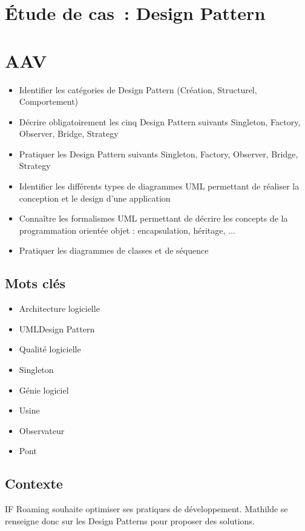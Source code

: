 \newpage
\section*{Étude de cas~: Design Pattern}

\section*{AAV}
\begin{itemize}
	\item [1] Identifier les catégories de Design Pattern (Création, Structurel, Comportement)
	\item [1] Décrire obligatoirement les cinq Design Pattern suivants Singleton, Factory, Observer, Bridge, Strategy
	\item [1] Pratiquer les Design Pattern suivants Singleton, Factory, Observer, Bridge, Strategy
	\item [1] Identifier les différents types de diagrammes UML permettant de réaliser la conception et le design d'une application
	\item [1] Connaître les formalismes UML permettant de décrire les concepts de la programmation orientée objet : encapsulation, héritage, ...
	\item [3] Pratiquer les diagrammes de classes et de séquence
\end{itemize}

\newpage

\subsection*{Mots clés}
{}
\begin{itemize}
	\item Architecture logicielle
	\item UMLDesign Pattern
	\item Qualité logicielle
	\item Singleton
	\item Génie logiciel
	\item Usine
	\item Observateur
	\item Pont
\end{itemize}

\subsection*{Contexte}
{}
\noindent IF Roaming souhaite optimiser ses pratiques de développement. Mathilde se renseigne donc sur les Design Patterns pour proposer des solutions.


